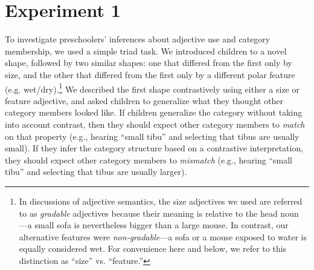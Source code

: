 \documentclass[man]{apa2}
\begin{document}
\section{Experiment 1}

To investigate preschoolers' inferences about adjective use and category membership, we used a simple triad task.  We introduced children to a novel shape, followed by two similar shapes: one that differed from the first only by size, and the other that differed from the first only by a different polar feature (e.g. wet/dry).\footnote{In discussions of adjective semantics, the size adjectives we used are referred to as \emph{gradable} adjectives because their meaning is relative to the head noun \cite{kennedy2012}---a small sofa is nevertheless bigger than a large mouse. In contrast, our alternative features were \emph{non-gradable}---a sofa or a mouse exposed to water is equally considered wet. For convenience here and below, we refer to this distinction as ``size'' vs. ``feature.''} We described the first shape contrastively using either a size or feature adjective, and asked children to generalize what they thought other category members looked like. If children generalize the category without taking into account contrast, then they should expect other category members to \emph{match} on that property  (e.g., hearing ``small tibu'' and selecting that tibus are usually small). If they infer the category structure based on a contrastive interpretation, they should expect other category members to \emph{mismatch} (e.g., hearing ``small tibu'' and selecting that tibus are usually larger). 


\end{document}
